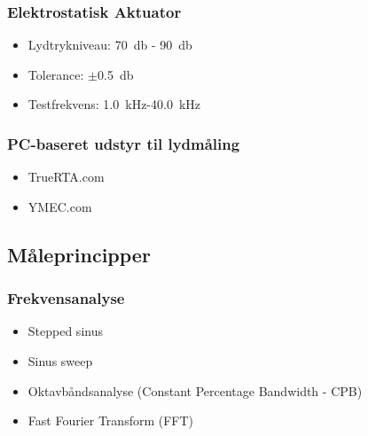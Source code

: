 \subsubsection{Elektrostatisk Aktuator}
\begin{itemize}
	\item Lydtrykniveau: \SI{70}{\decibel} - \SI{90}{\decibel}
	\item Tolerance: $\pm$\SI{0.5}{\decibel}
	\item Testfrekvens: \SI{1.0}{\kilo\hertz}-\SI{40.0}{\kilo\hertz}
\end{itemize}

\subsubsection{PC-baseret udstyr til lydmåling}
\begin{itemize}
	\item TrueRTA.com
	\item YMEC.com
\end{itemize}

\subsection{Måleprincipper}
\subsubsection{Frekvensanalyse}
\begin{itemize}
	\item Stepped sinus
	\item Sinus sweep
	\item Oktavbåndsanalyse (Constant Percentage Bandwidth - CPB)
	\item Fast Fourier Transform (FFT)
\end{itemize}

